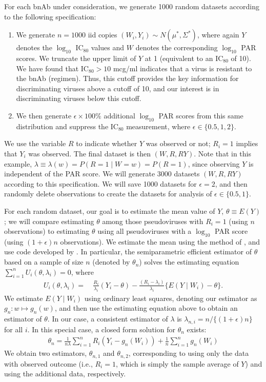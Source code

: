 \documentclass[10pt]{article}
\begin{document}
For each bnAb under consideration, we generate 1000 random datasets according to the following specification:
\begin{enumerate}
    \item We generate $n = 1000$ iid copies $(W_i, Y_i) \sim N(\mu^*, \Sigma^*)$, where again $Y$ denotes the $\log_{10}$ IC$_{80}$ values and $W$ denotes the corresponding $\log_{10}$ PAR scores. We truncate the upper limit of $Y$ at 1 (equivalent to an IC$_{80}$ of 10). We have found that IC$_{80} > 10$ mcg/ml indicates that a virus is resistant to the bnAb (regimen). Thus, this cutoff provides the key information for discriminating viruses above a cutoff of 10, and our interest is in discriminating viruses below this cutoff.
    \item We then generate $\epsilon \times 100$\% additional $\log_{10}$ PAR scores from this same distribution and suppress the IC$_{80}$ measurement, where $\epsilon \in \{0.5, 1, 2\}$.
\end{enumerate}
We use the variable $R$ to indicate whether $Y$ was observed or not; $R_i = 1$ implies that $Y_i$ was observed. The final dataset is then $(W, R, RY)$. Note that in this example, $\lambda \equiv \lambda(w) = P(R = 1 \mid W = w) = P(R = 1)$, since observing $Y$ is independent of the PAR score. We will generate 3000 datasets $(W, R, RY)$ according to this specification. We will save 1000 datasets for $\epsilon = 2$, and then randomly delete observations to create the datasets for analysis of $\epsilon \in \{0.5, 1\}$.

For each random dataset, our goal is to estimate the mean value of $Y$, $\theta \equiv E(Y)$; we will compare estimating $\theta$ among those pseudoviruses with $R_i = 1$ (using $n$ observations) to estimating $\theta$ using all pseudoviruses with a $\log_{10}$ PAR score (using $(1+\epsilon)n$ observations). We estimate the mean using the method of \citet{rotnitzky1995}, and use code developed by \citet{gilbert2014}. In particular, the semiparametric efficient estimator of $\theta$ based on a sample of size $n$ (denoted by $\theta_n$) solves the estimating equation $\sum_{i=1}^n U_i(\theta, \lambda_i) = 0$, where
\begin{align*}
    U_i(\theta, \lambda_i) =& \ \frac{R_i}{\lambda_i}(Y_i - \theta) - \frac{(R_i - \lambda_i)}{\lambda_i}\{E(Y \mid W_i) - \theta\}.
\end{align*}
We estimate $E(Y \mid W_i)$ using ordinary least squares, denoting our estimator as $g_n: w \mapsto g_n(w)$, and then use the estimating equation above to obtain an estimator of $\theta$. In our case, a consistent estimator of $\lambda$ is $\lambda_{n,i} = n / \{(1 + \epsilon)n\}$ for all $i$. In this special case, a closed form solution for $\theta_n$ exists:
\begin{align}\label{eq:aug_mean}
    \theta_n = \frac{1}{n\lambda}\sum_{i=1}^nR_i(Y_i - g_n(W_i)) + \frac{1}{n}\sum_{i=1}^n g_n(W_i)
\end{align}
 We obtain two estimators, $\theta_{n,1}$ and $\theta_{n,2}$, corresponding to using only the data with observed outcome (i.e., $R_i = 1$, which is simply the sample average of $Y$) and using the additional data, respectively.
\end{document}
